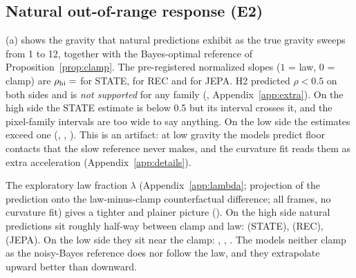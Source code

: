 \subsection{Natural out-of-range response (E2)}
\label{sec:natural}

(a) shows the gravity that natural predictions exhibit as the true gravity sweeps
from 1 to 12, together with the Bayes-optimal reference of Proposition~\ref{prop:clamp}. The
pre-registered normalized slopes ($1$ = law, $0$ = clamp) are
$\rho_{\rm hi}=$ \StateNatHi{} for STATE, \RecNatHi{} for REC and \JepaNatHi{} for JEPA.
H2 predicted $\rho<0.5$ on both sides and is \emph{not supported} for any family (, Appendix~\ref{app:extra}).
On the high side the STATE estimate is below 0.5 but its interval crosses it, and the pixel-family
intervals are too wide to say anything. On the low side the estimates exceed one
(\StateNatLo, \RecNatLo, \JepaNatLo). This is an artifact: at low gravity the models predict floor contacts that the slow reference
never makes, and the curvature fit reads them as extra acceleration (Appendix~\ref{app:details}).

The exploratory law fraction $\lambda$ (Appendix~\ref{app:lambda}; projection of the prediction onto the law-minus-clamp
counterfactual difference; all frames, no curvature fit) gives a tighter and plainer picture
(). On the high side natural predictions sit roughly half-way between clamp and
law: \StateLambdaNatHi{} (STATE), \RecLambdaNatHi{} (REC), \JepaLambdaNatHi{} (JEPA). On the low
side they sit near the clamp: \StateLambdaNatLo{}, \RecLambdaNatLo{}, \JepaLambdaNatLo. The models
neither clamp as the noisy-Bayes reference does nor follow the law, and they extrapolate upward
better than downward.


